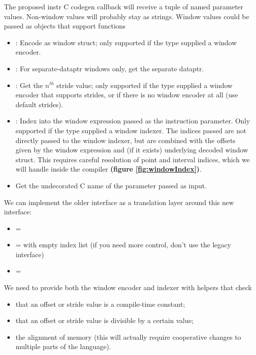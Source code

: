 The proposed instr C codegen callback will receive a tuple of named parameter values.
Non-window values will probably stay as strings.
Window values could be passed as objects that support functions
\begin{itemize}
  \item {}: Encode as window struct; only supported if the  type supplied a window encoder.
  \filbreak
  \item {}: For separate-dataptr windows only, get the separate dataptr.
  \filbreak
  \item {}: Get the $n^{th}$ stride value; only supported if the  type supplied a window encoder that supports strides, or if there is no window encoder at all (use default strides).
  \filbreak
  \item {}: Index into the window expression passed as the instruction parameter.
    Only supported if the  type supplied a window indexer.
    The indices passed are not directly passed to the window indexer, but are combined with the offsets given by the window expression and (if it exists) underlying decoded window struct.
    This requires careful resolution of point and interval indices, which we will handle inside the compiler \textbf{(figure \ref{fig:windowIndex})}.
  \filbreak
  \item {} Get the undecorated C name of the parameter passed as input.
\end{itemize}
\filbreak
We can implement the older  interface as a translation layer around this new interface:
\begin{itemize}
  \item {} = 
  \item {} =  with empty index list (if you need more control, don't use the legacy interface)
  \item {} = 
\end{itemize}

\filbreak
{}

We need to provide both the window encoder and indexer with helpers that check
\begin{itemize}
  \item that an offset or stride value is a compile-time constant;
  \filbreak
  \item that an offset or stride value is divisible by a certain value;
  \filbreak
  \item the alignment of memory (this will actually require cooperative changes to multiple parts of the language).
\end{itemize}

